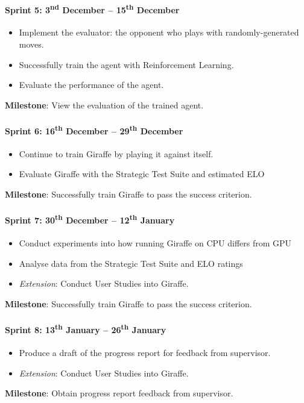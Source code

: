 \documentclass[12pt,a4paper]{book}
\begin{document}
\paragraph{Sprint 5: 3\textsuperscript{nd} December -- 15\textsuperscript{th} December}
\begin{itemize}
\item Implement the evaluator: the opponent who plays with randomly-generated moves.
\item Successfully train the agent with Reinforcement Learning.
\item Evaluate the performance of the agent.
\end{itemize}

\textbf{Milestone}: View the evaluation of the trained agent.

\paragraph{Sprint 6: 16\textsuperscript{th} December -- 29\textsuperscript{th} December}
\begin{itemize}
\item Continue to train Giraffe by playing it against itself.
\item Evaluate Giraffe with the Strategic Test Suite and estimated ELO
\end{itemize}

\textbf{Milestone}: Successfully train Giraffe to pass the success criterion.

\paragraph{Sprint 7: 30\textsuperscript{th} December -- 12\textsuperscript{th} January}
\begin{itemize}
\item Conduct experiments into how running Giraffe on CPU differs from GPU
\item Analyse data from the Strategic Test Suite and ELO ratings
\item \textit{Extension}: Conduct User Studies into Giraffe.
\end{itemize}

\textbf{Milestone}: Successfully train Giraffe to pass the success criterion.

\paragraph{Sprint 8: 13\textsuperscript{th} January -- 26\textsuperscript{th} January}
\begin{itemize}
\item Produce a draft of the progress report for feedback from supervisor.
\item \textit{Extension}: Conduct User Studies into Giraffe.
\end{itemize}
\textbf{Milestone}: Obtain progress report feedback from supervisor.
\end{document}
